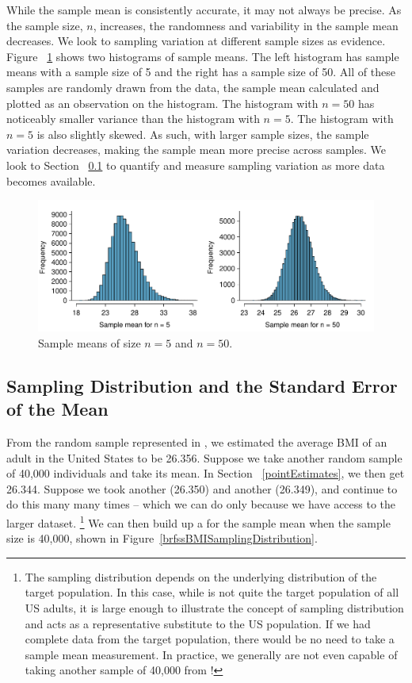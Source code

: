 While the sample mean is consistently accurate, it may not always be precise. As the sample size, $n$, increases, the randomness and variability in the sample mean decreases. We look to sampling variation at different sample sizes as evidence. Figure ~\ref{sampleMeanPrecision} shows two histograms of sample means. The left histogram has sample means with a sample size of 5 and the right has a sample size of 50. All of these samples are randomly drawn from the  data, the sample mean calculated and plotted as an observation on the histogram. The histogram with $n=50$ has noticeably smaller variance than the histogram with $n=5$. The histogram with $n=5$ is also slightly skewed. As such, with larger sample sizes, the sample variation decreases, making the sample mean more precise across samples. We look to Section ~\ref{seOfTheMean} to quantify and measure sampling variation as more data becomes available. 

\begin{figure}
   \centering
   \includegraphics[width=\textwidth]{ch_inference_foundations_oi_biostat/figures/brfssBMISampleMeanPrecision/brfssBMISampleMeanPrecision}
   \caption{Sample means of size $n=5$ and $n=50$.}
   \label{sampleMeanPrecision}
\end{figure}
 
\subsection{Sampling Distribution and the Standard Error of the Mean}
\label{seOfTheMean}

From the random sample represented in , we estimated the average BMI of an adult in the United States to be 26.356. Suppose we take another random sample of 40,000 individuals and take its mean. In Section ~\ref{pointEstimates}, we then get 26.344. Suppose we took another (26.350) and another (26.349), and continue to do this many many times -- which we can do only because we have access to the larger  dataset. \footnote{The sampling distribution depends on the underlying distribution of the target population. In this case, while  is not quite the target population of all US adults, it is large enough to illustrate the concept of sampling distribution and acts as a representative substitute to the US population. If we had complete data from the target population, there would be no need to take a sample mean measurement. In practice, we generally are not even capable of taking another sample of 40,000 from !} We can then build up a  for the sample mean when the sample size is 40,000, shown in Figure~\ref{brfssBMISamplingDistribution}.

